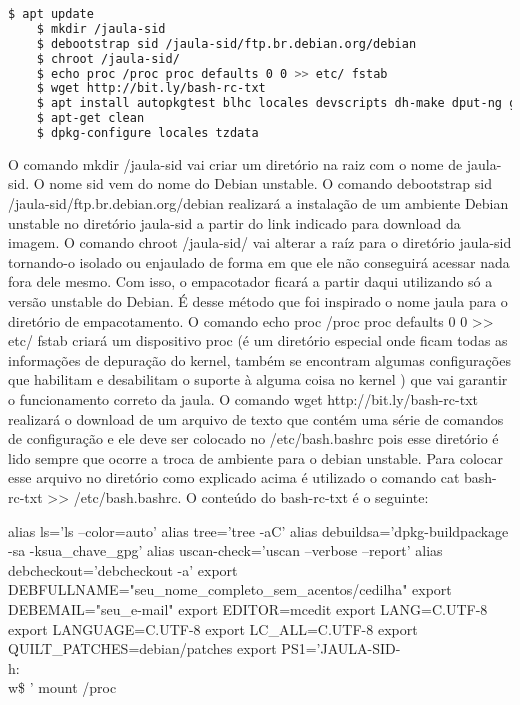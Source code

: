 \begin{lstlisting}[language=bash]
	$ apt update
	$ mkdir /jaula-sid
	$ debootstrap sid /jaula-sid/ftp.br.debian.org/debian
	$ chroot /jaula-sid/
	$ echo proc /proc proc defaults 0 0 >> etc/ fstab
	$ wget http://bit.ly/bash-rc-txt
	$ apt install autopkgtest blhc locales devscripts dh-make dput-ng git-buildpackage mc quilt spell tardiff tree lintian
	$ apt-get clean
	$ dpkg-configure locales tzdata
\end{lstlisting}

O comando mkdir /jaula-sid vai criar um diretório na raiz com o nome de jaula-sid. O nome sid vem do nome do Debian unstable. O comando debootstrap sid /jaula-sid/ftp.br.debian.org/debian realizará a instalação de um ambiente Debian unstable no diretório jaula-sid a partir do link indicado para download da imagem. O comando chroot /jaula-sid/ vai alterar a raíz para o diretório jaula-sid tornando-o isolado ou enjaulado de forma em que ele não conseguirá acessar nada fora dele mesmo. Com isso, o empacotador ficará a partir daqui utilizando só a versão unstable do Debian. É desse método que foi inspirado o nome jaula para o diretório de empacotamento. O comando echo proc /proc proc defaults 0 0 >> etc/ fstab  criará um dispositivo proc (é um diretório especial onde ficam todas as informações de depuração do kernel, também se encontram algumas configurações que habilitam e desabilitam o suporte à alguma coisa no kernel ) que vai garantir o funcionamento correto da jaula. O comando wget http://bit.ly/bash-rc-txt realizará o download de um arquivo de texto que contém uma série de comandos de configuração e ele deve ser colocado no /etc/bash.bashrc pois esse diretório é lido sempre que ocorre a troca de ambiente para o debian unstable. Para colocar esse arquivo no diretório como explicado acima é utilizado o comando cat bash-rc-txt >> /etc/bash.bashrc. O conteúdo do bash-rc-txt é o seguinte:

alias ls='ls --color=auto' 
alias tree='tree -aC' 
alias debuildsa='dpkg-buildpackage -sa -ksua\_chave\_gpg' 
alias uscan-check='uscan --verbose --report' 
alias debcheckout='debcheckout -a' 
export DEBFULLNAME="seu\_nome\_completo\_sem\_acentos/cedilha" 
export DEBEMAIL="seu\_e-mail" export EDITOR=mcedit export LANG=C.UTF-8 export LANGUAGE=C.UTF-8 
export LC\_ALL=C.UTF-8 
export QUILT\_PATCHES=debian/patches 
export PS1='JAULA-SID-\u@\\h:\\w\$ ' 
mount /proc 

